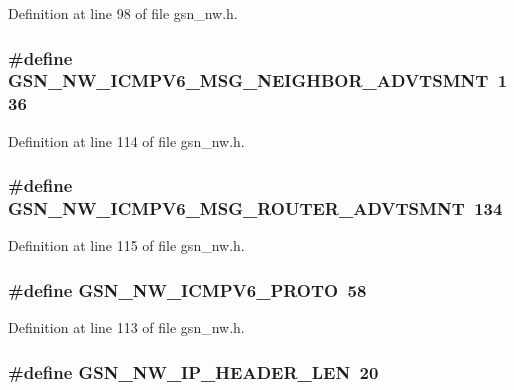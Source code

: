 Definition at line 98 of file gsn\_\-nw.h.

\hypertarget{a00532_aa0aa9e2bbc754e9b936e74bf3ca029da}{
\subsubsection[{GSN\_\-NW\_\-ICMPV6\_\-MSG\_\-NEIGHBOR\_\-ADVTSMNT}]{\setlength{\rightskip}{0pt plus 5cm}\#define GSN\_\-NW\_\-ICMPV6\_\-MSG\_\-NEIGHBOR\_\-ADVTSMNT~136}}
\label{a00532_aa0aa9e2bbc754e9b936e74bf3ca029da}


Definition at line 114 of file gsn\_\-nw.h.

\hypertarget{a00532_a27f5c9b5b802b99a08e3e43e2714e66d}{
\subsubsection[{GSN\_\-NW\_\-ICMPV6\_\-MSG\_\-ROUTER\_\-ADVTSMNT}]{\setlength{\rightskip}{0pt plus 5cm}\#define GSN\_\-NW\_\-ICMPV6\_\-MSG\_\-ROUTER\_\-ADVTSMNT~134}}
\label{a00532_a27f5c9b5b802b99a08e3e43e2714e66d}


Definition at line 115 of file gsn\_\-nw.h.

\hypertarget{a00532_aa45655995857c7f814122d96de2edf55}{
\subsubsection[{GSN\_\-NW\_\-ICMPV6\_\-PROTO}]{\setlength{\rightskip}{0pt plus 5cm}\#define GSN\_\-NW\_\-ICMPV6\_\-PROTO~58}}
\label{a00532_aa45655995857c7f814122d96de2edf55}


Definition at line 113 of file gsn\_\-nw.h.

\hypertarget{a00532_a0c03d87409256ce8a7b5162a21abd999}{
\subsubsection[{GSN\_\-NW\_\-IP\_\-HEADER\_\-LEN}]{\setlength{\rightskip}{0pt plus 5cm}\#define GSN\_\-NW\_\-IP\_\-HEADER\_\-LEN~20}}
\label{a00532_a0c03d87409256ce8a7b5162a21abd999}


